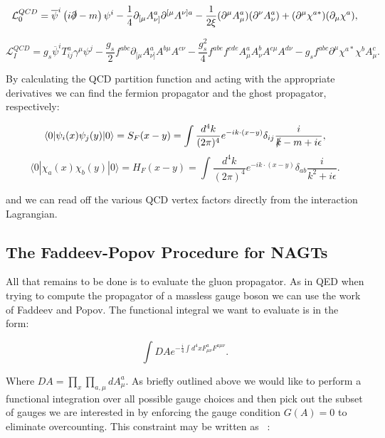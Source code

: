 	\begin{equation}
	\mathcal{L}_0^{QCD} = \overline{\psi}^i\left(i\slashed \partial-m\right)\psi^i - \frac{1}{4}\partial_{[\mu}A_{\nu]}^a\partial^{[\mu}A^{\nu]a} - \frac{1}{2\xi}(\partial^\mu A_\mu^a)(\partial^\nu A_\nu^a) + (\partial^\mu \chi^{a*})(\partial_\mu \chi^a),
	\end{equation}

	\begin{equation}
	\mathcal{L}_{I}^{QCD} = g_s\overline{\psi}^i T^a_{ij}\gamma^\mu\psi^j-\frac{g_s}{2}f^{abc}\partial_{[\mu}A^a_{\nu]}A^{b\mu}A^{c\nu}-\frac{g_s^2}{4}f^{abe}f^{cde}A^a_\mu A^b_\nu A^{c\mu}A^{d\nu}-g_sf^{abc}\partial^\mu\chi^{a*}\chi^bA^c_\mu.
	\end{equation}

	By calculating the QCD partition function and acting with the appropriate derivatives we can find the fermion propagator and the ghost propagator, respectively:

	\begin{equation}
	\langle0|\psi_i(x)\psi_j(y)|0\rangle = S_F(x-y) = \int \frac{d^4k}{(2\pi)^4}e^{-ik\cdot(x-y)}\delta_{ij}\frac{i}{\slashed k - m +i\epsilon},
	\end{equation}
	\begin{equation}
	\langle0|\chi_a(x)\chi_b(y)|0\rangle = H_F(x-y) = \int \frac{d^4k}{(2\pi)^4}e^{-ik\cdot(x-y)}\delta_{ab}\frac{i}{k^2+i\epsilon}.
	\end{equation}

	and we can read off the various QCD vertex factors directly from the interaction Lagrangian.

	\subsection{The Faddeev-Popov Procedure for NAGTs}

	All that remains to be done is to evaluate the gluon propagator.  As in QED when trying to compute the propagator of a massless gauge boson we can use the work of Faddeev and Popov.  The functional integral we want to evaluate is in the form:

	\begin{equation}
	\int DAe^{-\frac{i}{4}\int d^4xF^a_{\mu\nu}F^{a\mu\nu}}.
	\end{equation}

	Where $DA=\prod_x\prod_{a, \mu}dA^a_\mu$.  As briefly outlined above we would like to perform a functional integration over all possible gauge choices and then pick out the subset of gauges we are interested in by enforcing the gauge condition $G(A)=0$ to eliminate overcounting.  This constraint may be written as ~\cite{p&s}:

